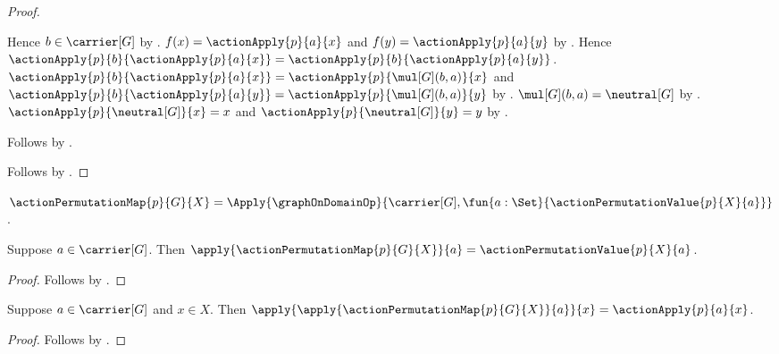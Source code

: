\begin{proof}
\begin{subproof}
\begin{subproof}
            Hence $b\in\carrier[G]$ by .
            $f(x)=\actionApply{p}{a}{x}$ and
                $f(y)=\actionApply{p}{a}{y}$ by
                .
            Hence
                $\actionApply{p}{b}{\actionApply{p}{a}{x}}=
                 \actionApply{p}{b}{\actionApply{p}{a}{y}}$.
            $\actionApply{p}{b}{\actionApply{p}{a}{x}}=
                \actionApply{p}{\mul[G](b,a)}{x}$ and
                $\actionApply{p}{b}{\actionApply{p}{a}{y}}=
                \actionApply{p}{\mul[G](b,a)}{y}$ by
                .
            $\mul[G](b,a)=\neutral[G]$ by
                .
            $\actionApply{p}{\neutral[G]}{x}=x$ and
                $\actionApply{p}{\neutral[G]}{y}=y$ by
                .
        \end{subproof}
        Follows by .
    \end{subproof}
    Follows by .
\end{proof}

\begin{definition}\label{action_permutation_map}
    $\actionPermutationMap{p}{G}{X}=
        \Apply{\graphOnDomainOp}{
            \carrier[G],
            \fun{a:\Set}{\actionPermutationValue{p}{X}{a}}}$.
\end{definition}

\begin{proposition}\label{action_permutation_map_apply}
    Suppose $a\in\carrier[G]$.
    Then
        $\apply{\actionPermutationMap{p}{G}{X}}{a}=
            \actionPermutationValue{p}{X}{a}$.
\end{proposition}
\begin{proof}
    Follows by
        .
\end{proof}

\begin{proposition}\label{action_permutation_map_value}
    Suppose $a\in\carrier[G]$ and $x\in X$.
    Then
        $\apply{\apply{\actionPermutationMap{p}{G}{X}}{a}}{x}
            =\actionApply{p}{a}{x}$.
\end{proposition}
\begin{proof}
    Follows by
        .
\end{proof}

